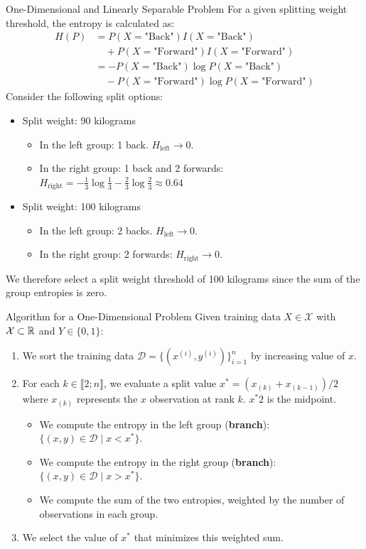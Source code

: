 \begin{frame}{One-Dimensional and Linearly Separable Problem}
	For a given splitting weight threshold, the entropy is calculated as:
	\begin{align*}
		H(P) &= P(X = \text{"Back"}) I(X = \text{"Back"}) \\
		&\quad + P(X = \text{"Forward"}) I(X = \text{"Forward"}) \\
		&= - P(X = \text{"Back"}) \log P(X = \text{"Back"}) \\
		&\quad - P(X = \text{"Forward"}) \log P(X = \text{"Forward"})
	\end{align*}
	Consider the following split options:
	\begin{itemize}
		\item Split weight: 90 kilograms
		\begin{itemize}
			\item In the left group: 1 back. $H_{\text{left}} \to 0$.
			\item In the right group: 1 back and 2 forwards: $H_{\text{right}} = - \frac{1}{3} \log \frac{1}{3} - \frac{2}{3} \log \frac{2}{3} \approx 0.64$
		\end{itemize}
		\pause
		\item Split weight: 100 kilograms
		\begin{itemize}
			\item In the left group: 2 backs. $H_{\text{left}} \to 0$.
			\item In the right group: 2 forwards: $H_{\text{right}} \to 0$.
		\end{itemize}		
	\end{itemize}
	\pause
	We therefore select a split weight threshold of 100 kilograms since the sum of the group entropies is zero.
\end{frame}

\begin{frame}{Algorithm for a One-Dimensional Problem}
	Given training data $X \in \mathcal{X}$ with $\mathcal{X} \subset \mathbb{R}$ and $Y \in\{0, 1\}$:
	\begin{enumerate}
		\item We sort the training data $\mathcal{D} = \{(x^{(i)}, y^{(i)})\}_{i=1}^n$ by increasing value of $x$.
		\pause
		\item For each $k \in \llbracket 2; n \rrbracket$, we evaluate a split value $x^* = \left(x_{(k)} + x_{(k - 1)}\right) / 2$ where $x_{(k)}$ represents the $x$ observation at rank $k$. $x^*2$ is the midpoint.
		\begin{itemize}
			\item We compute the entropy in the left group (\textbf{branch}): $\{(x, y) \in \mathcal{D} \mid x < x^*\}$.
			\item We compute the entropy in the right group (\textbf{branch}): $\{(x, y) \in \mathcal{D} \mid x > x^*\}$.
			\item We compute the sum of the two entropies, weighted by the number of observations in each group.
		\end{itemize}
		\pause
		\item We select the value of $x^*$ that minimizes this weighted sum.
	\end{enumerate}
\end{frame}

